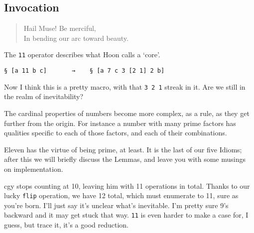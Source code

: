 \documentclass[twoside]{article}
\begin{document}
\subsection{Invocation}

\begin{quote}
Hail Muse! Be merciful, \\
In bending our arc toward beauty.
\end{quote}

The \texttt{11} operator describes what Hoon calls a `core'.

\begin{lstlisting}[style=listingcode]
§ [a 11 b c]       →    § [a 7 c 3 [2 1] 2 b]
\end{lstlisting}

\noindent
Now I think this is a pretty macro, with that \texttt{3 2 1} streak in it.  Are we still in the realm of inevitability?

The cardinal properties of numbers become more complex, as a rule, as they get further from the origin. For instance a number with many prime factors has qualities specific to each of those factors, and each of their combinations. %

Eleven has the virtue of being prime, at least. It is the last of our five Idioms; after this we will briefly discuss the Lemmas, and leave you with some musings on implementation.

cgy stops counting at 10, leaving him with 11 operations in total. Thanks to our lucky \texttt{flip} operation, we have 12 total, which must enumerate to 11, sure as you're born.%
%
I'll just say it's unclear what's inevitable. I'm pretty sure 9's backward and it may get stuck that way. \texttt{11} is even harder to make a case for, I guess, but trace it, it's a good reduction.
\end{document}
